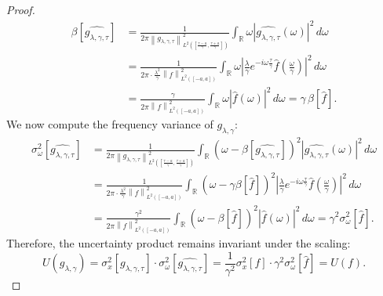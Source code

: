 \documentclass[preprint,hidelinks,authoryear]{elsarticle}
\theoremstyle{plain}
\theoremstyle{definition}
\theoremstyle{remark}
\begin{document}
\begin{proof}
\begin{equation}
\begin{split}
\beta[\widehat{g_{\lambda,\gamma,\tau}}] 
&= \frac{1}{2\pi \left\| g_{\lambda,\gamma,\tau} \right\|^2_{L^2\left( \left[\frac{\tau-a}{\gamma}, \frac{\tau+a}{\gamma} \right] \right)}} \int_{\mathbb{R}} \omega \left| \widehat{g_{\lambda,\gamma,\tau}}(\omega) \right|^2 \, d\omega \\
&= \frac{1}{2\pi \cdot \frac{\lambda^2}{\gamma} \left\| f \right\|^2_{L^2([-a,a])}} \int_{\mathbb{R}} \omega \left| \frac{\lambda}{\gamma}e^{-i\omega\frac{\tau}{\gamma}} \hat{f}\left( \frac{\omega}{\gamma} \right) \right|^2 \, d\omega \\
&= \frac{\gamma}{2\pi \left\| f \right\|^2_{L^2([-a,a])}} \int_{\mathbb{R}} \omega \left| \hat{f}\left( \omega \right) \right|^2 \, d\omega = \gamma \, \beta[\widehat{f}].
\end{split}
\label{uguaglianza media frequenza}
\end{equation}
We now compute the frequency variance of $ g_{\lambda,\gamma} $:
\begin{equation}
\begin{split}
\sigma_\omega^2[\widehat{g_{\lambda,\gamma,\tau}}] 
&= \frac{1}{2\pi \left\| g_{\lambda,\gamma,\tau} \right\|^2_{L^2\left( \left[\frac{\tau-a}{\gamma}, \frac{\tau+a}{\gamma} \right] \right)}} \int_{\mathbb{R}} \left( \omega - \beta[\widehat{g_{\lambda,\gamma,\tau}}] \right)^2 \left| \widehat{g_{\lambda,\gamma,\tau}}(\omega) \right|^2 \, d\omega \\
&= \frac{1}{2\pi \cdot \frac{\lambda^2}{\gamma} \left\| f \right\|^2_{L^2([-a,a])}} \int_{\mathbb{R}} \left( \omega - \gamma \beta[\hat{f}] \right)^2 \left| \frac{\lambda}{\gamma} e^{-i\omega
\frac{\tau}{\gamma}}\hat{f}\left( \frac{\omega}{\gamma} \right) \right|^2 \, d\omega \\
&= \frac{\gamma^2}{2\pi \left\| f \right\|^2_{L^2([-a,a])}} \int_{\mathbb{R}} \left( \omega - \beta[\hat{f}] \right)^2 \left| \hat{f}(\omega) \right|^2 \, d\omega = \gamma^2 \sigma_\omega^2[\widehat{f}].
\end{split}
\label{varianzafrequenza}
\end{equation}
Therefore, the uncertainty product remains invariant under the scaling:
\begin{equation}
U(g_{\lambda,\gamma}) = \sigma_x^2[g_{\lambda,\gamma,\tau}] \cdot \sigma_\omega^2[\widehat{g_{\lambda,\gamma,\tau}}] = \frac{1}{\gamma^2} \sigma_x^2[f] \cdot \gamma^2 \sigma_\omega^2[\widehat{f}] = U(f).
\label{uguaglianza incertezze riscalatmnto}
\end{equation}


\end{proof}
\end{document}
